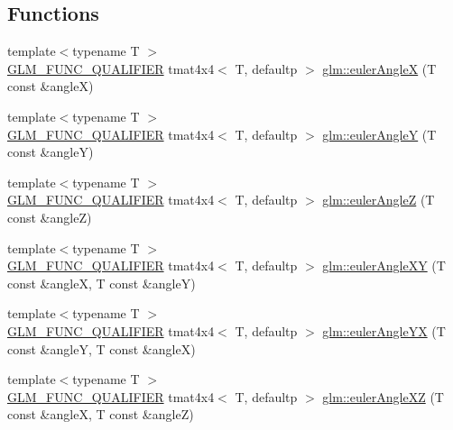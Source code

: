 \subsection*{Functions}
\begin{DoxyCompactItemize}
\item 
{\footnotesize template$<$typename T $>$ }\\\mbox{\hyperlink{setup_8hpp_a33fdea6f91c5f834105f7415e2a64407}{G\+L\+M\+\_\+\+F\+U\+N\+C\+\_\+\+Q\+U\+A\+L\+I\+F\+I\+ER}} tmat4x4$<$ T, defaultp $>$ \mbox{\hyperlink{group__gtx__euler__angles_ga82cd3b8a04943f1a0d1a562aff358dc8}{glm\+::euler\+AngleX}} (T const \&angleX)
\item 
{\footnotesize template$<$typename T $>$ }\\\mbox{\hyperlink{setup_8hpp_a33fdea6f91c5f834105f7415e2a64407}{G\+L\+M\+\_\+\+F\+U\+N\+C\+\_\+\+Q\+U\+A\+L\+I\+F\+I\+ER}} tmat4x4$<$ T, defaultp $>$ \mbox{\hyperlink{group__gtx__euler__angles_gaeb193af1184bdf39c23636d756e1ff33}{glm\+::euler\+AngleY}} (T const \&angleY)
\item 
{\footnotesize template$<$typename T $>$ }\\\mbox{\hyperlink{setup_8hpp_a33fdea6f91c5f834105f7415e2a64407}{G\+L\+M\+\_\+\+F\+U\+N\+C\+\_\+\+Q\+U\+A\+L\+I\+F\+I\+ER}} tmat4x4$<$ T, defaultp $>$ \mbox{\hyperlink{group__gtx__euler__angles_gab59c4fe7f735568255cc19fddd3ddfcd}{glm\+::euler\+AngleZ}} (T const \&angleZ)
\item 
{\footnotesize template$<$typename T $>$ }\\\mbox{\hyperlink{setup_8hpp_a33fdea6f91c5f834105f7415e2a64407}{G\+L\+M\+\_\+\+F\+U\+N\+C\+\_\+\+Q\+U\+A\+L\+I\+F\+I\+ER}} tmat4x4$<$ T, defaultp $>$ \mbox{\hyperlink{group__gtx__euler__angles_ga8bf84f92ca976a7f50dbe4b30ceb72dd}{glm\+::euler\+Angle\+XY}} (T const \&angleX, T const \&angleY)
\item 
{\footnotesize template$<$typename T $>$ }\\\mbox{\hyperlink{setup_8hpp_a33fdea6f91c5f834105f7415e2a64407}{G\+L\+M\+\_\+\+F\+U\+N\+C\+\_\+\+Q\+U\+A\+L\+I\+F\+I\+ER}} tmat4x4$<$ T, defaultp $>$ \mbox{\hyperlink{group__gtx__euler__angles_gafdd02f9a37511190962119adef5c1c25}{glm\+::euler\+Angle\+YX}} (T const \&angleY, T const \&angleX)
\item 
{\footnotesize template$<$typename T $>$ }\\\mbox{\hyperlink{setup_8hpp_a33fdea6f91c5f834105f7415e2a64407}{G\+L\+M\+\_\+\+F\+U\+N\+C\+\_\+\+Q\+U\+A\+L\+I\+F\+I\+ER}} tmat4x4$<$ T, defaultp $>$ \mbox{\hyperlink{group__gtx__euler__angles_gab2d7dc94b9a7519d741aaa208c7a335b}{glm\+::euler\+Angle\+XZ}} (T const \&angleX, T const \&angleZ)

\end{DoxyCompactItemize}
